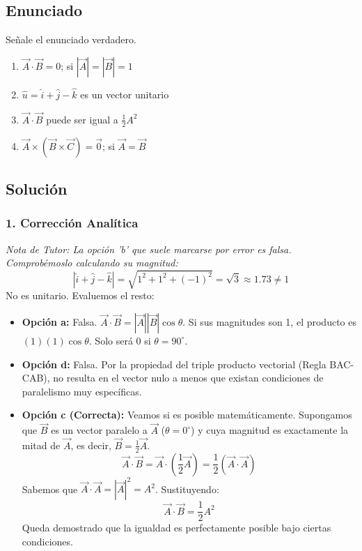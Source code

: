 \documentclass[12pt, a4paper]{article}
\begin{document}
\subsection*{Enunciado}
Señale el enunciado verdadero.
\begin{enumerate}[label=\alph*)]
    \item $\vec{A} \cdot \vec{B} = 0$; si $|\vec{A}| = |\vec{B}| = 1$
    \item $\hat{u} = \hat{i} + \hat{j} - \hat{k}$ es un vector unitario
    \item $\vec{A} \cdot \vec{B}$ puede ser igual a $\frac{1}{2} A^2$
    \item $\vec{A} \times (\vec{B} \times \vec{C}) = \vec{0}$; si $\vec{A} = \vec{B}$
\end{enumerate}

\subsection*{Solución}

\subsubsection*{1. Corrección Analítica}
\textit{Nota de Tutor: La opción 'b' que suele marcarse por error es falsa. Comprobémoslo calculando su magnitud:}
$$ |\hat{i} + \hat{j} - \hat{k}| = \sqrt{1^2 + 1^2 + (-1)^2} = \sqrt{3} \approx 1.73 \neq 1 $$
No es unitario. Evaluemos el resto:

\begin{itemize}
    \item \textbf{Opción a:} Falsa. $\vec{A} \cdot \vec{B} = |\vec{A}||\vec{B}|\cos\theta$. Si sus magnitudes son 1, el producto es $(1)(1)\cos\theta$. Solo será $0$ si $\theta = 90^\circ$.
    \item \textbf{Opción d:} Falsa. Por la propiedad del triple producto vectorial (Regla BAC-CAB), no resulta en el vector nulo a menos que existan condiciones de paralelismo muy específicas.
    \item \textbf{Opción c (Correcta):} Veamos si es posible matemáticamente. Supongamos que $\vec{B}$ es un vector paralelo a $\vec{A}$ ($\theta = 0^\circ$) y cuya magnitud es exactamente la mitad de $\vec{A}$, es decir, $\vec{B} = \frac{1}{2}\vec{A}$.
    $$ \vec{A} \cdot \vec{B} = \vec{A} \cdot \left( \frac{1}{2} \vec{A} \right) = \frac{1}{2} (\vec{A} \cdot \vec{A}) $$
    Sabemos que $\vec{A} \cdot \vec{A} = |\vec{A}|^2 = A^2$. Sustituyendo:
    $$ \vec{A} \cdot \vec{B} = \frac{1}{2} A^2 $$
    Queda demostrado que la igualdad es perfectamente posible bajo ciertas condiciones.
\end{itemize}
\end{document}
